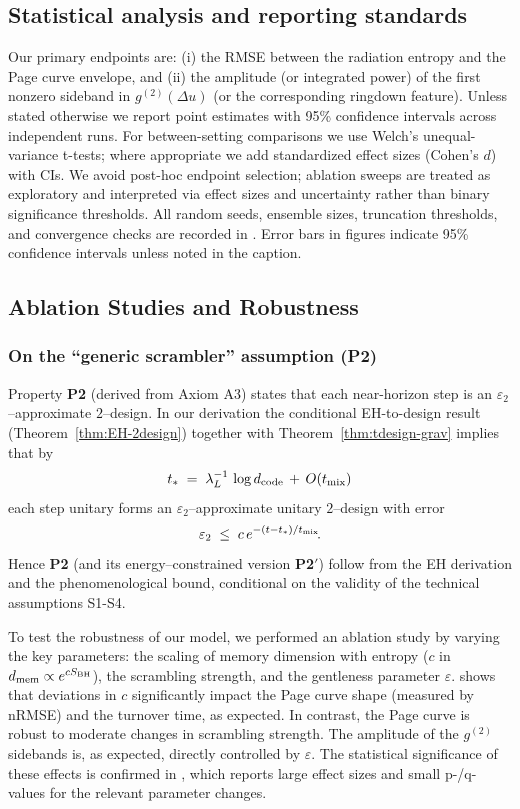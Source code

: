 \documentclass[aps,prd,preprint,onecolumn,superscriptaddress,nofootinbib,longbibliography,floatfix,11pt,showpacs,showkeys]{revtex4-2}
\newcommand{\Ptwo}{\textbf{P2}\xspace}
\newcommand{\PtwoPrime}{\textbf{P2$'$}\xspace}
\theoremstyle{plain}
\theoremstyle{definition}
\theoremstyle{remark}
\begin{document}
\subsection{Statistical analysis and reporting standards}

\label{ssec:stats}
Our primary endpoints are: (i) the RMSE between the radiation entropy and the Page curve envelope, and (ii) the amplitude (or integrated power) of the first nonzero sideband in $g^{(2)}(\Delta u)$ (or the corresponding ringdown feature). Unless stated otherwise we report point estimates with 95\% confidence intervals across independent runs. For between-setting comparisons we use Welch's unequal-variance t-tests; where appropriate we add standardized effect sizes (Cohen's $d$) with CIs. We avoid post-hoc endpoint selection; ablation sweeps are treated as exploratory and interpreted via effect sizes and uncertainty rather than binary significance thresholds. All random seeds, ensemble sizes, truncation thresholds, and convergence checks are recorded in . Error bars in figures indicate 95\% confidence intervals unless noted in the caption.

\subsection{Ablation Studies and Robustness}
\subsubsection{On the ``generic scrambler'' assumption (\Ptwo)}
Property \Ptwo{} (derived from Axiom A3) states that each near-horizon step is an $\varepsilon_2$--approximate $2$--design.
In our derivation the conditional EH-to-design result (Theorem~\ref{thm:EH-2design}) together with Theorem~\ref{thm:tdesign-grav} implies that by
\[
t_\ast \;=\; \lambda_L^{-1}\,\log d_{\rm code} \,+\, O(t_{\rm mix})
\]
each step unitary forms an $\varepsilon_2$--approximate unitary $2$--design with error
\[
\varepsilon_2 \;\le\; c\,e^{-(t-t_\ast)/t_{\rm mix}}\!.
\]
Hence \Ptwo{} (and its energy--constrained version \PtwoPrime) follow from the EH derivation and the phenomenological bound, conditional on the validity of the technical assumptions S1-S4.

To test the robustness of our model, we performed an ablation study by varying the key parameters: the scaling of memory dimension with entropy ($c$ in $d_{\rm mem} \propto e^{c S_{\rm BH}}$), the scrambling strength, and the gentleness parameter $\varepsilon$.  shows that deviations in $c$ significantly impact the Page curve shape (measured by nRMSE) and the turnover time, as expected. In contrast, the Page curve is robust to moderate changes in scrambling strength. The amplitude of the $g^{(2)}$ sidebands is, as expected, directly controlled by $\varepsilon$. The statistical significance of these effects is confirmed in , which reports large effect sizes and small p-/q-values for the relevant parameter changes.
\end{document}
